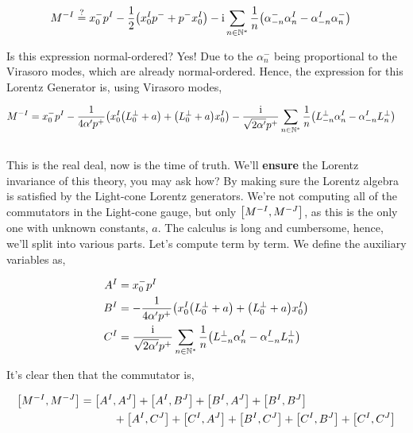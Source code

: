 \begin{align*}
    M^{-I}&\stackrel{?}{=}x_0^- p^I-\frac12\qty(x_0^I p^-+p^-x_0^I)-\textnormal{i}\sum\limits_{n\in\mathbb N^\ast}\frac{1}{n}\qty(\alpha^-_{-n}\alpha^I_{n}-\alpha^I_{-n}\alpha^-_{n})
\end{align*}

Is this expression normal-ordered? Yes! Due to the $\alpha_n^-$ being proportional to the Virasoro modes, which are already normal-ordered. Hence, the expression for this 
Lorentz Generator is, using Virasoro modes,

\begin{align*}
    M^{-I}&=x_0^- p^I-\frac{1}{4\alpha'p^+}\qty(x_0^I\qty(L_0^\perp+a)+\qty(L_0^\perp+a)x_0^I)-\frac{\textnormal{i}}{\sqrt{2\alpha'}p^+}\sum\limits_{n\in\mathbb N^\ast}\frac{1}{n}\qty(L^\perp_{-n}\alpha^I_{n}-\alpha^I_{-n}L^\perp_n)
\end{align*}

\subsection{}

This is the real deal, now is the time of truth. We'll \textbf{ensure} the Lorentz invariance of this theory, you may ask how? 
By making sure the Lorentz algebra is satisfied by the Light-cone Lorentz generators. We're not computing all of the commutators in 
the Light-cone gauge, but only $\comm{M^{-I}}{M^{-J}}$, as this is the only one with unknown constants, $a$. The calculus is long and 
cumbersome, hence, we'll split into various parts. Let's compute term by term. We define the auxiliary variables as,

\begin{align*}
    A^I&=x_0^- p^I\\
    B^I&=-\frac{1}{4\alpha'p^+}\qty(x_0^I\qty(L_0^\perp+a)+\qty(L_0^\perp+a)x_0^I)\\
    C^I&=\frac{\textnormal{i}}{\sqrt{2\alpha'}p^+}\sum\limits_{n\in\mathbb N^\ast}\frac{1}{n}\qty(L^\perp_{-n}\alpha^I_{n}-\alpha^I_{-n}L^\perp_n)
\end{align*}

It's clear then that the commutator is,

\begin{align*}
    \comm{M^{-I}}{M^{-J}}&=\comm{A^I}{A^J}+\comm{A^I}{B^J}+\comm{B^I}{A^J}+\comm{B^I}{B^J}\\
    &\quad\quad\quad+\comm{A^I}{C^J}+\comm{C^I}{A^J}+\comm{B^I}{C^J}+\comm{C^I}{B^J}+\comm{C^I}{C^J}
\end{align*}

